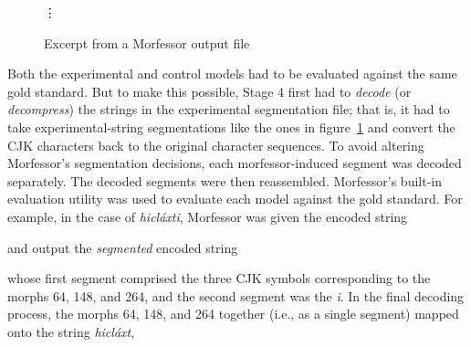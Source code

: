 {\begin{figure}[t]
\begin{mdframed}
\vdots
\label{fig:morfessor-output}
\caption{Excerpt from a Morfessor output file}
\end{mdframed}
\end{figure}
Both the experimental and control models had to be evaluated against the same gold standard.
But to make this possible, Stage 4 first had to \emph{decode} (or \emph{decompress}) the strings in the experimental segmentation file; that is, it had to take experimental-string segmentations like the ones in 
figure~\ref{fig:morfessor-output} and convert the CJK characters back to the original character sequences.
To avoid altering Morfessor’s segmentation decisions, 
each morfessor-induced segment 
was decoded separately. The decoded segments were then reassembled. 
Morfessor's built-in evaluation utility was used to evaluate each model against the gold standard. 
For example, 
in the case of \textit{hicl\'{a}xti}, %
Morfessor was given the encoded string 
\begin{center}
\end{center}
and output the \emph{segmented} encoded string
\begin{center}
\end{center}
whose first segment comprised the three  
CJK symbols corresponding to the morphs 64, 148, and 264, 
and the second segment was the \emph{i}. In the final decoding process, 
the morphs 64, 148, and 264 together (i.e., as a single segment) mapped onto the string \textit{hicl\'{a}xt}, 
}
